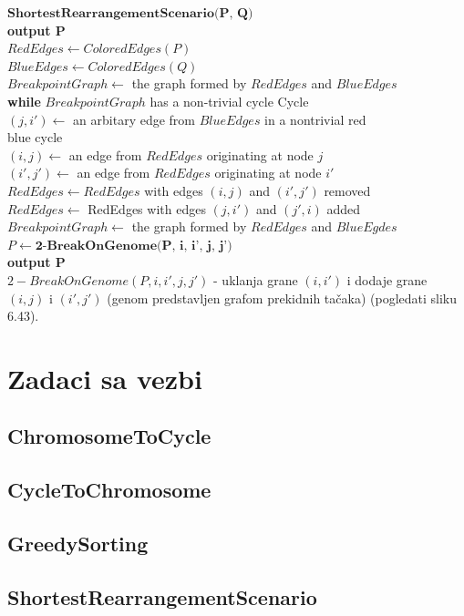 \noindent $\textbf{ShortestRearrangementScenario(P, Q)}$\\
\indent \textbf{output P}\\
\indent $RedEdges \leftarrow ColoredEdges(P)$\\
\indent $BlueEdges \leftarrow ColoredEdges(Q)$\\
\indent $BreakpointGraph \leftarrow$ the graph formed by $RedEdges$ and $BlueEdges$\\
\indent \textbf{while} \hspace{0.2cm} $BreakpointGraph$ has a non-trivial cycle Cycle\\
\indent \indent $(j, i') \leftarrow$ an arbitary edge from $BlueEdges$ in a nontrivial red \\
\indent \indent blue cycle\\
\indent \indent $(i, j) \leftarrow$ an edge from $RedEdges$ originating  at node $j$\\
\indent \indent $(i', j') \leftarrow$ an edge from $RedEdges$ originating at node $i'$\\
\indent \indent $RedEdges \leftarrow RedEdges$ with edges $(i, j)$ and $(i', j')$ removed\\
\indent \indent $RedEdges \leftarrow$ RedEdges with edges $(j, i')$ and $(j', i)$ added\\
\indent \indent $BreakpointGraph \leftarrow$ the graph formed by $RedEdges$ and $BlueEgdes$\\
\indent \indent $P \leftarrow \textbf{2-BreakOnGenome(P, i, i', j, j')}$\\
\indent \indent \textbf{output P}\\

\noindent $2-BreakOnGenome(P, i, i', j, j')$ - uklanja grane $(i, i')$ i dodaje grane $(i, j)$ i $(i', j')$ (genom predstavljen grafom prekidnih tačaka) (pogledati sliku 6.43).

\newpage

\section{Zadaci sa vezbi}

\setexamplecodestyle
\subsection{ChromosomeToCycle}


\subsection{CycleToChromosome}


\subsection{GreedySorting}


\subsection{ShortestRearrangementScenario}



